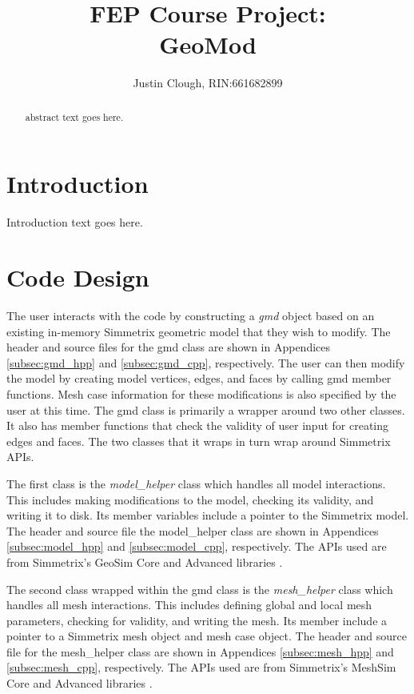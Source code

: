 \documentclass[a4paper, 12pt]{article}
\author{Justin Clough, RIN:661682899}
\title{FEP Course Project: \\
        GeoMod}
\begin{document}
\maketitle

\begin{abstract}
abstract text goes here.

\end{abstract}

\section{Introduction} \label{sec:intro}
Introduction text goes here.

\section{Code Design} \label{sec:design}
The user interacts with the code by constructing a \emph{gmd}
object based on an existing in-memory Simmetrix geometric model that they 
wish to modify. The header and source files for the gmd class 
are shown in Appendices \ref{subsec:gmd_hpp} and \ref{subsec:gmd_cpp}, 
respectively.  The user can then modify the model by 
creating model vertices, edges, and faces by calling
gmd member functions. Mesh case information for these 
modifications is also specified by the user at this time.
The gmd class is primarily a wrapper around two other classes. It also
has member functions that check the validity of user input for creating 
edges and faces. The two classes that it wraps in turn wrap around Simmetrix APIs.

The first class is the \emph{model\_helper} class 
which handles all model interactions. This includes making modifications to
the model, checking its validity, and writing it to disk. Its member variables
include a pointer to the Simmetrix model. The header and source file the 
model\_helper class are shown in Appendices \ref{subsec:model_hpp} and 
\ref{subsec:model_cpp}, respectively. The APIs used are from Simmetrix's 
GeoSim Core and Advanced libraries \cite{Simmetrix}. 

The second class wrapped within the gmd class is the
\emph{mesh\_helper} class which handles all mesh interactions. This includes
defining global and local mesh parameters, checking for validity, and writing the
mesh. Its member include a pointer to a Simmetrix mesh object and mesh case object. 
The header and source file for the mesh\_helper class are shown in 
Appendices \ref{subsec:mesh_hpp} and \ref{subsec:mesh_cpp}, respectively.
The APIs used are from Simmetrix's MeshSim Core and Advanced libraries 
\cite{Simmetrix}.
\end{document}
